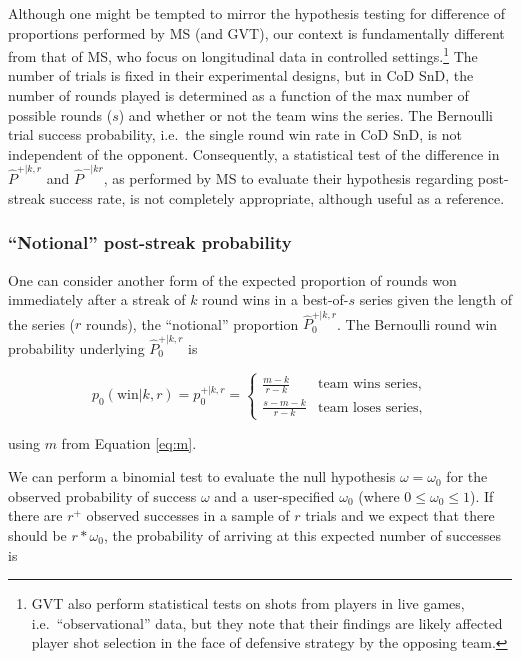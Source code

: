 \documentclass{article}
\begin{document}
Although one might be tempted to mirror the hypothesis testing for
difference of proportions performed by MS (and GVT), our context is
fundamentally different from that of MS, who focus on longitudinal data
in controlled settings.\footnote{GVT also perform statistical tests on
  shots from players in live games, i.e.~``observational'' data, but
  they note that their findings are likely affected player shot
  selection in the face of defensive strategy by the opposing team.} The
number of trials is fixed in their experimental designs, but in CoD SnD,
the number of rounds played is determined as a function of the max
number of possible rounds (\(s\)) and whether or not the team wins the
series. The Bernoulli trial success probability, i.e.~the single round
win rate in CoD SnD, is not independent of the opponent. Consequently, a
statistical test of the difference in \(\hat{P}^{+|k,r}\) and
\(\hat{P}^{-|kr}\), as performed by MS to evaluate their hypothesis
regarding post-streak success rate, is not completely appropriate,
although useful as a reference.

\hypertarget{notional-post-streak-probability}{%
\subsubsection{``Notional'' post-streak
probability}\label{notional-post-streak-probability}}

One can consider another form of the expected proportion of rounds won
immediately after a streak of \(k\) round wins in a best-of-\(s\) series
given the length of the series (\(r\) rounds), the ``notional''
proportion \(\hat{P}^{+|k,r}_0\). The Bernoulli round win probability
underlying \(\hat{P}^{+|k,r}_0\) is

\begin{equation}\label{eq:pwkr}
p_0(\text{win} | k, r) = p^{+|k,r}_0 = \begin{cases}
\frac{m - k}{r - k} & \text{team wins series}, \\
\frac{s - m - k}{r - k} & \text{team loses series},
\end{cases}
\end{equation}

using \(m\) from Equation \ref{eq:m}.

We can perform a binomial test to evaluate the null hypothesis
\(\omega = \omega_0\) for the observed probability of success \(\omega\)
and a user-specified \(\omega_0\) (where \(0 \leq \omega_0 \leq 1\)). If
there are \(r^+\) observed successes in a sample of \(r\) trials and we
expect that there should be \(r * \omega_0\), the probability of
arriving at this expected number of successes is
\end{document}
